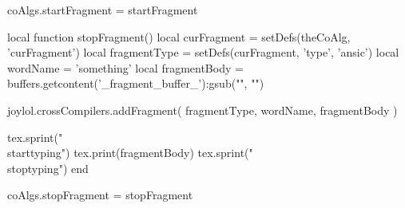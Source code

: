 coAlgs.startFragment = startFragment

local function stopFragment()
  local curFragment  = setDefs(theCoAlg, 'curFragment')
  local fragmentType = setDefs(curFragment, 'type', 'ansic')
  local wordName     = 'something'
  local fragmentBody = buffers.getcontent('_fragment_buffer_'):gsub("", "\n")

  joylol.crossCompilers.addFragment(
    fragmentType,
    wordName,
    fragmentBody
  )

  tex.sprint("\\starttyping")
  tex.print(fragmentBody)
  tex.sprint("\\stoptyping")
end

coAlgs.stopFragment = stopFragment
\stopLuaCode

\stopTestSuite
